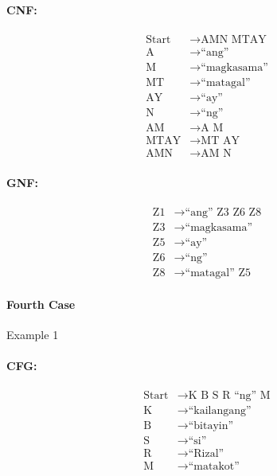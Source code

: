 \paragraph{CNF:}
\begin{equation*}
    \begin{aligned}
        \text{Start}   & \rightarrow \text{AMN MTAY}   \\
        \text{A} & \rightarrow \text{“ang”} \\
        \text{M} & \rightarrow \text{“magkasama”} \\
        \text{MT} & \rightarrow \text{“matagal”} \\
        \text{AY} & \rightarrow \text{“ay”} \\
        \text{N} & \rightarrow \text{“ng”} \\
        \text{AM} & \rightarrow \text{A M} \\
        \text{MTAY} & \rightarrow \text{MT AY} \\
        \text{AMN} & \rightarrow \text{AM N}
    \end{aligned}
\end{equation*}

\paragraph{GNF:}
\begin{equation*}
    \begin{aligned}
        \text{Z1}   & \rightarrow \text{“ang” Z3 Z6 Z8}   \\
        \text{Z3} & \rightarrow \text{“magkasama”} \\
        \text{Z5} & \rightarrow \text{“ay”} \\
        \text{Z6} & \rightarrow \text{“ng”} \\
        \text{Z8} & \rightarrow \text{“matagal” Z5}
    \end{aligned}
\end{equation*}


\paragraph{Fourth Case}
Example 1
\paragraph{CFG:}
\begin{equation*}
    \begin{aligned}
        \text{Start}   & \rightarrow \text{K B S R “ng” M}   \\
        \text{K} & \rightarrow \text{“kailangang”} \\
        \text{B} & \rightarrow \text{“bitayin”} \\
        \text{S} & \rightarrow \text{“si”} \\
        \text{R} & \rightarrow \text{“Rizal”} \\
        \text{M} & \rightarrow \text{“matakot”}
    \end{aligned}
\end{equation*}


